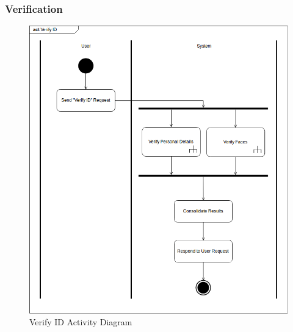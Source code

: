 \documentclass{article}
\begin{document}
\subsubsection{Verification}
	\begin{figure}[h]
		\centering
		\includegraphics[scale=0.4]{img/verify_id_activity.png}
		\caption{Verify ID Activity Diagram}
	\end{figure}
\pagebreak
\end{document}
